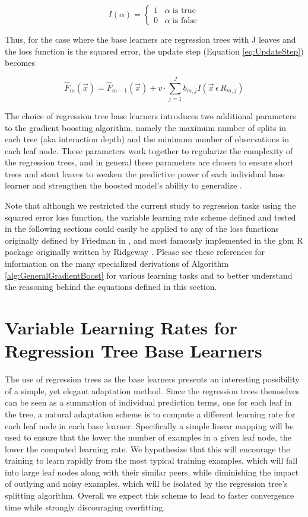 \documentclass[conference]{IEEEtran}
\begin{document}
	\[ I(\alpha) = \begin{cases} 
	1 & \alpha \text{ is true} \\
	0 & \alpha \text{ is false}  
	\end{cases}
	\]
	
	Thus, for the case where the base learners are regression trees with J leaves and the loss function is the squared error, the update step (Equation \ref{eq:UpdateStep}) becomes
	
	\begin{equation}
	\hat{F}_m(\vec{x}) = \hat{F}_{m-1}(\vec{x}) + v  \cdot \sum_{j=1}^{J}b_{m,j}I(\vec{x} \, \epsilon \, R_{m,j})
	\label{eq:UpdateStep2}
	\end{equation}
	
The choice of regression tree base learners introduces two additional parameters to the gradient boosting algorithm, namely the maximum number of splits in each tree (aka interaction depth)  and the minimum number of observations in each leaf node. These parameters work together to regularize the complexity of the regression trees, and in general these parameters are chosen to ensure short trees and stout leaves to weaken the predictive power of each individual base learner and strengthen the boosted model's ability to generalize \cite{ecological}. 

Note that although we restricted the current study to regression tasks using the squared error loss function, the variable learning rate scheme defined and tested in the following sections could easily be applied to any of the loss functions originally defined by Friedman in \cite{2001Friedman} \cite{2002Friedman}, and most famously implemented in the gbm R package originally written by Ridgeway \cite{2012ridgeway}. Please see these references for information on the many specialized derivations of Algorithm \ref{alg:GeneralGradientBoost} for various learning tasks and to better understand the reasoning behind the equations defined in this section.

\section{Variable Learning Rates for Regression Tree Base Learners}

The use of regression trees as the base learners presents an interesting possibility of a simple, yet elegant adaptation method. Since the regression trees themselves can be seen as a summation of individual prediction terms, one for each leaf in the tree, a natural adaptation scheme is to compute a different learning rate for each leaf node in each base learner. Specifically a simple linear mapping will be used to ensure that the lower the number of examples in a given leaf node, the lower the computed learning rate. We hypothesize that this will encourage the training to learn rapidly from the most typical training examples, which will fall into large leaf nodes along with their similar peers, while diminishing the impact of outlying and noisy examples, which will be isolated by the regression tree's splitting algorithm. Overall we expect this scheme to lead to faster convergence time while strongly discouraging overfitting.
\end{document}
